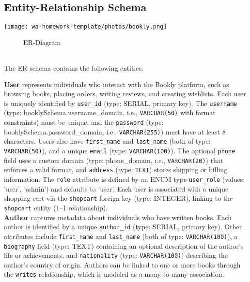 \subsection{Entity-Relationship Schema}

\texttt{[image: wa-homework-template/photos/bookly.png]}

\begin{figure}[h!]
    \centering
 
    \caption{ER-Diagram}
    \label{fig:enter-label}
\end{figure}\\


The ER schema contains the following entities:


\textbf{User} represents individuals who interact with the Bookly platform, such as browsing books, placing orders, writing reviews, and creating wishlists. Each user is uniquely identified by \texttt{user\_id} (type: SERIAL, primary key). The \texttt{username} (type: booklySchema.username\_domain, i.e., \texttt{VARCHAR(50)} with format constraints) must be unique, and the \texttt{password} (type: booklySchema.password\_domain, i.e., \texttt{VARCHAR(255)}) must have at least 8 characters. Users also have \texttt{first\_name} and \texttt{last\_name} (both of type: \texttt{VARCHAR(50)}), and a unique \texttt{email} (type: \texttt{VARCHAR(100)}). The optional \texttt{phone} field uses a custom domain (type: phone\_domain, i.e., \texttt{VARCHAR(20)}) that enforces a valid format, and \texttt{address} (type: \texttt{TEXT}) stores shipping or billing information. The \texttt{role} attribute is defined by an ENUM type \texttt{user\_role} (values: 'user', 'admin') and defaults to 'user'. Each user is associated with a unique shopping cart via the \texttt{shopcart} foreign key (type: INTEGER), linking to the \texttt{shopcart} entity (1–1 relationship).\\

\textbf{Author} captures metadata about individuals who have written books. Each author is identified by a unique \texttt{author\_id} (type: SERIAL, primary key). Other attributes include \texttt{first\_name} and \texttt{last\_name} (both of type: \texttt{VARCHAR(100)}), a \texttt{biography} field (type: TEXT) containing an optional description of the author's life or achievements, and \texttt{nationality} (type: \texttt{VARCHAR(100)}) describing the author’s country of origin. Authors can be linked to one or more books through the \texttt{writes} relationship, which is modeled as a many-to-many association.\\

